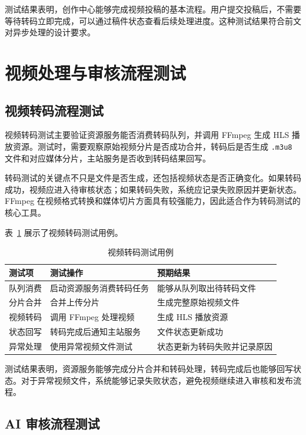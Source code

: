 测试结果表明，创作中心能够完成视频投稿的基本流程。用户提交投稿后，不需要等待转码立即完成，可以通过稿件状态查看后续处理进度。这种测试结果符合前文对异步处理的设计要求。

\section{视频处理与审核流程测试}
\label{sec:video-audit-test}

\subsection{视频转码流程测试}
\label{subsec:transcode-test}

视频转码测试主要验证资源服务能否消费转码队列，并调用 FFmpeg 生成 HLS 播放资源。测试时，需要观察原始视频分片是否成功合并，转码后是否生成 \texttt{.m3u8} 文件和对应媒体分片，主站服务是否收到转码结果回写。

转码测试的关键点不只是文件是否生成，还包括视频状态是否正确变化。如果转码成功，视频应进入待审核状态；如果转码失败，系统应记录失败原因并更新状态。FFmpeg 在视频格式转换和媒体切片方面具有较强能力，因此适合作为转码测试的核心工具\cite{ffmpegdocs}。

表~\ref{tab:transcode-test} 展示了视频转码测试用例。

\begin{table}[htbp]
  \centering
  \caption{视频转码测试用例}
  \label{tab:transcode-test}
  \begin{tabular}{p{}p{}p{}}
    \hline
    \textbf{测试项} & \textbf{测试操作} & \textbf{预期结果} \\
    \hline
    队列消费 & 启动资源服务消费转码任务 & 能够从队列取出待转码文件 \\
    分片合并 & 合并上传分片 & 生成完整原始视频文件 \\
    视频转码 & 调用 FFmpeg 处理视频 & 生成 HLS 播放资源 \\
    状态回写 & 转码完成后通知主站服务 & 文件状态更新成功 \\
    异常处理 & 使用异常视频文件测试 & 状态更新为转码失败并记录原因 \\
    \hline
  \end{tabular}
\end{table}

测试结果表明，资源服务能够完成分片合并和转码处理，转码完成后也能够回写状态。对于异常视频文件，系统能够记录失败状态，避免视频继续进入审核和发布流程。

\subsection{AI 审核流程测试}
\label{subsec:ai-audit-test}

